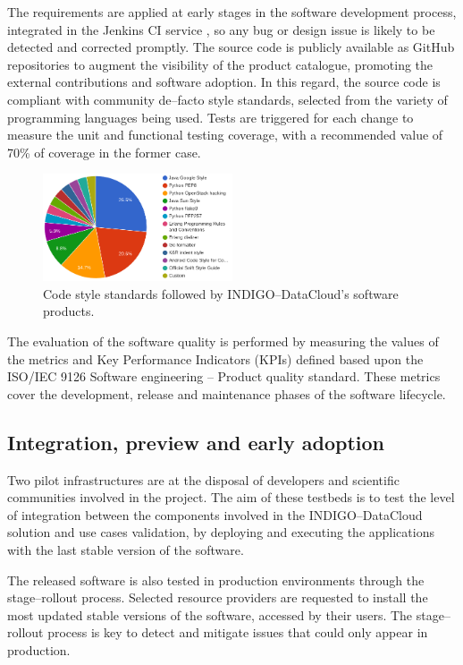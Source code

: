 \documentclass[journal]{IEEEtran}
\begin{document}
The requirements are applied at early stages in the software development process, integrated in the Jenkins CI service \cite{indigo-jenkins}, so any bug or design issue is likely to be detected and corrected promptly. The source code is publicly available as GitHub repositories \cite{indigo-github} to augment the visibility of the product catalogue, promoting the external contributions and software adoption. In this regard, the source code is compliant with community de--facto style standards, selected from the variety of programming languages being used. Tests are triggered for each change to measure the unit and functional testing coverage, with a recommended value of 70\% of coverage in the former case.

\begin{figure}[!t]
\centering
\includegraphics[width=0.5\textwidth]{images/codestyle.png}
\caption{Code style standards followed by INDIGO--DataCloud's software products.}
\label{fig:fig_codestyle}
\end{figure}

The evaluation of the software quality is performed by measuring the values of the metrics and Key Performance Indicators (KPIs) defined based upon the ISO/IEC 9126 Software engineering -- Product quality standard. These metrics cover the development, release and maintenance phases of the software lifecycle.

\subsection{Integration, preview and early adoption}

Two pilot infrastructures are at the disposal of developers and scientific communities involved in the project. The aim of these testbeds is to test the level of integration between the components involved in the INDIGO--DataCloud solution and use cases validation, by deploying and executing the applications with the last stable version of the software.

The released software is also tested in production environments through the stage--rollout process. Selected resource providers are requested to install the most updated stable versions of the software, accessed by their users. The stage--rollout process is key to detect and mitigate issues that could only appear in production.
\end{document}
